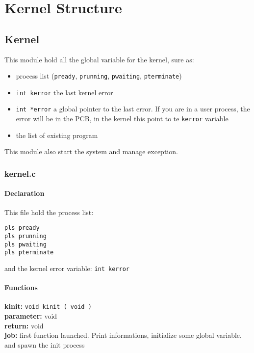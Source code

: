 \chapter{Kernel Structure}

\section{Kernel}

This module hold all the global variable for the kernel, sure as:
\begin{itemize}
  \item process list (\verb+pready+, \verb+prunning+, \verb+pwaiting+, \verb+pterminate+)
  \item \verb+int kerror+ the last kernel error
  \item \verb+int *error+ a global pointer to the last error. If you are in a user process, the error will be in the PCB, in the kernel this point to te \verb+kerror+ variable
  \item the list of existing program
\end{itemize}

This module also start the system and manage exception.

\subsection{kernel.c}

\subsubsection{Declaration}

This file hold the process list:
\begin{verbatim}
pls pready
pls prunning
pls pwaiting
pls pterminate
\end{verbatim}

and the kernel error variable: \verb+int kerror+\\

\subsubsection{Functions}

\noindent\textbf{kinit:} \verb+void kinit ( void )+\\
\textbf{parameter:} void\\
\textbf{return:} void\\
\textbf{job:} first function launched. Print informations, initialize some global variable, and spawn the init process\\

